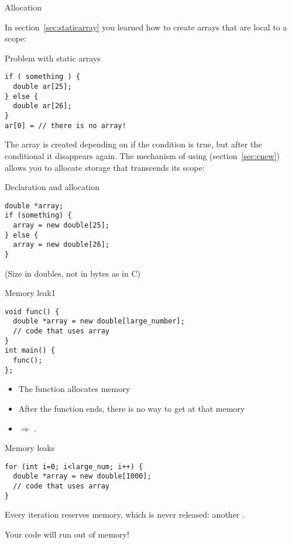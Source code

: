  {Allocation}

In section~\ref{sec:staticarray} you learned how to create arrays that
are local to a scope:

\begin{block}{Problem with static arrays}
  \label{sl:no-static-alloc}
\begin{verbatim}
if ( something ) {
  double ar[25];
} else {
  double ar[26];
}
ar[0] = // there is no array!
\end{verbatim}
\end{block}

The array  is created depending on if the condition is true, but
after
the conditional it disappears again. The mechanism of using
 (section~\ref{sec:cnew}) allows you to allocate
storage that transcends its scope:

\begin{block}{Declaration and allocation}
  \label{sl:c-array-new}
\begin{verbatim}
double *array;
if (something) {
  array = new double[25];
} else {
  array = new double[26];
}
\end{verbatim}
(Size in doubles, not in bytes as in C)
\end{block}

\begin{block}{Memory leak1}
  \label{sl:leak1}
\begin{verbatim}
void func() {
  double *array = new double[large_number];
  // code that uses array
}
int main() {
  func();
};
\end{verbatim}
\begin{itemize}
\item
  The function allocates memory
\item After the function ends, there is no way to get at that memory
\item $\Rightarrow$ .
\end{itemize}

\end{block}

\begin{block}{Memory leaks}
  \label{sl:leak2}
\begin{verbatim}
for (int i=0; i<large_num; i++) {
  double *array = new double[1000];
  // code that uses array
}
\end{verbatim}
  Every iteration reserves memory, which is never released:
  another .

  Your code will run out of memory!
\end{block}

